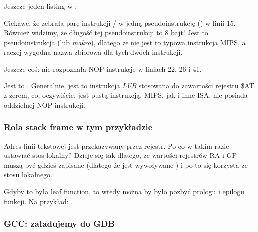 Jeszcze jeden listing w \IDA:



Ciekawe, że \IDA zebrała parę instrukcji / w jedną pseudoinstrukcję 
 () w linii 15.
Również widzimy, że długość tej pseudoinstrukcji to 8 bajt!
Jest to pseudoinstrukcja (lub \emph{makro}), dlatego że nie jest to typowa instrukcja MIPS, a raczej wygodna nazwa zbiorowa dla tych dwóch instrukcji.

Jeszcze coś: \IDA nie rozpoznała \ac{NOP}-instrukcje w liniach 22, 26 i 41.

Jest to .
Generalnie, jest to instrukcja \emph{LUB} stosowana do zawartości rejestru \$AT z zerem,
co, oczywiście, jest pustą instrukcją.
MIPS, jak i inne \ac{ISA}, nie posiada oddzielnej \ac{NOP}-instrukcji.

\subsubsection{Rola stack frame w tym przykładzie}

Adres linii tekstowej jest przekazywany przez rejestr.
Po co w takim razie ustawiać stos lokalny?
Dzieje się tak dlatego, że wartości rejestrów \ac{RA} i GP muszą być gdzieś zapisane
(dlatego że jest wywoływane \printf) i po to się korzysta ze stosu lokalnego.

Gdyby to była \gls{leaf function}, to wtedy można by było pozbyć prologu i epilogu funkcji. Na przykład:
 .

\subsubsection{\Optimizing GCC: załadujemy do GDB}




